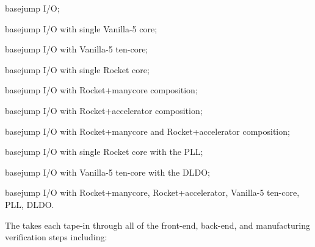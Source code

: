 \begin{cbxlist}{1.5em}{1em}{1em}
    \smallskip
    \begin{cbxlist}[--]{1.5em}{0em}{0em}
      \raggedright

      \item basejump I/O;
      \item basejump I/O with single Vanilla-5 core;
      \item basejump I/O with Vanilla-5 ten-core;
      \item basejump I/O with single Rocket core;
      \item basejump I/O with Rocket+manycore composition;
      \item basejump I/O with Rocket+accelerator composition;
      \item basejump I/O with Rocket+manycore and Rocket+accelerator composition;
      \item basejump I/O with single Rocket core with the PLL;
      \item basejump I/O with Vanilla-5 ten-core with the DLDO;
      \item basejump I/O with Rocket+manycore, Rocket+accelerator,
         Vanilla-5 ten-core, PLL, DLDO.

    \end{cbxlist}

 \item The  takes each
    tape-in through all of the front-end, back-end, and manufacturing
    verification steps including:

    \smallskip
    \begin{cbxlist}[--]{1.5em}{0em}{0em}
      \raggedright


\end{cbxlist}
\end{cbxlist}
